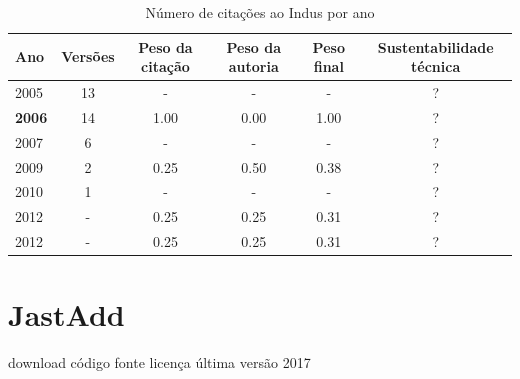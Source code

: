 \begin{table}[H]
\caption{Número de citações ao Indus por ano}
\centering
\begin{tabular}{| l | c | c | c | c | c |}
  \hline
  Ano & Versões & Peso da citação & Peso da autoria & Peso final & Sustentabilidade técnica \\
  \hline
        2005 & 13 & - & - & - & ? \\
\hline
            {\bf 2006}
          &
          14
          &
          1.00
          &
          0.00
          &
            {\color{blue} 1.00}
          &
          ?
          \\
\hline
        2007 & 6 & - & - & - & ? \\
\hline
            2009
          &
          2
          &
          0.25
          &
          0.50
          &
            {\color{red} 0.38}
          &
          ?
          \\
\hline
        2010 & 1 & - & - & - & ? \\
\hline
            2012
          &
          -
          &
          0.25
          &
          0.25
          &
            {\color{red} 0.31}
          &
          ?
          \\
            2012
          &
          -
          &
          0.25
          &
          0.25
          &
            {\color{red} 0.31}
          &
          ?
          \\
\hline
\end{tabular}
\end{table}



\section{JastAdd}
\checkmark download
\checkmark código fonte
\checkmark licença
\checkmark última versão 2017



